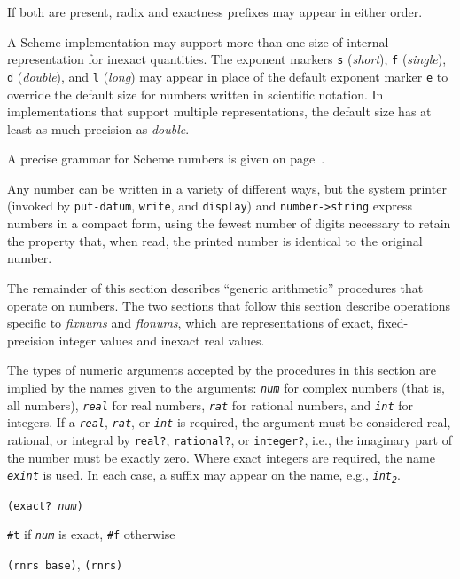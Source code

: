 If both are present, radix and exactness prefixes may appear in
either order.


A Scheme implementation may support more than one size of internal
representation for inexact quantities.
The exponent markers
\label{objects_s82}\texttt{s} (\textit{short}),
\label{objects_s83}\texttt{f} (\textit{single}),
\label{objects_s84}\texttt{d} (\textit{double}),
and
\label{objects_s85}\texttt{l} (\textit{long})
may appear in place of the default exponent marker
\texttt{e} to override the default size for numbers written in scientific
notation.
In implementations that support multiple representations, the
default size has at least as much precision as \textit{double}.


A precise grammar for Scheme numbers is given 
on page \pageref{grammar_grammar_numbers}.


Any number can be written in a variety of different ways, but the
system printer (invoked by \texttt{put-datum}, \texttt{write}, and \texttt{display}) and
\texttt{number-\textgreater{}string} express numbers in a compact form,
using the fewest number of digits necessary to retain
the property that, when read, the printed number is identical
to the original number.



The remainder of this section describes ``generic arithmetic'' procedures
that operate on numbers.
The two sections that follow this section describe operations specific to
\textit{fixnums} and \textit{flonums}, which are representations of exact,
fixed-precision integer values and inexact real values.


The types of numeric arguments accepted by the procedures in this section
are implied by the names given to the arguments: \texttt{\textit{num}} for complex
numbers (that is, all numbers), \texttt{\textit{real}} for real numbers, \texttt{\textit{rat}}
for rational numbers, and \texttt{\textit{int}} for integers.
If a \texttt{\textit{real}}, \texttt{\textit{rat}}, or \texttt{\textit{int}} is required, the argument must be
considered real, rational, or integral by \texttt{real?},
\texttt{rational?}, or \texttt{integer?}, i.e., the imaginary part of the
number must be exactly zero.
Where exact integers are required, the name \texttt{\textit{exint}} is used.
In each case, a suffix may appear on the name, e.g., \texttt{\textit{int\textsubscript{2}}}.


\begin{description}

\label{objects_s86}\item[procedure] \texttt{(exact? \textit{num})}



\item[returns] \texttt{\#{}t} if \texttt{\textit{num}} is exact, \texttt{\#{}f} otherwise


\item[libraries] \texttt{(rnrs base)}, \texttt{(rnrs)}
\end{description}


